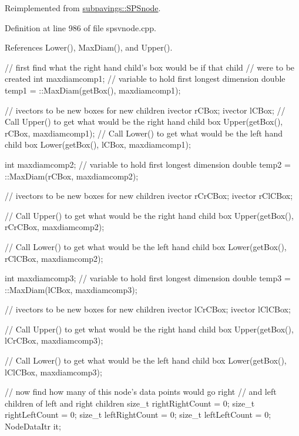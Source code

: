 \-Reimplemented from \hyperlink{classsubpavings_1_1SPSnode_acbe47754c218f0c895a900330491cbb3}{subpavings\-::\-S\-P\-Snode}.



\-Definition at line 986 of file spsvnode.\-cpp.



\-References \-Lower(), \-Max\-Diam(), and \-Upper().


\begin{DoxyCode}
    {
        // first find what the right hand child's box would be if that child
        // were to be created
            int maxdiamcomp1; // variable to hold first longest dimension
            double temp1 = ::MaxDiam(getBox(), maxdiamcomp1);

            // ivectors to be new boxes for new children
            ivector rCBox;
            ivector lCBox;
            // Call Upper() to get what would be the right hand child box
            Upper(getBox(), rCBox, maxdiamcomp1);
            // Call Lower() to get what would be the left hand child box
            Lower(getBox(), lCBox, maxdiamcomp1);

            int maxdiamcomp2; // variable to hold first longest dimension
            double temp2 = ::MaxDiam(rCBox, maxdiamcomp2);

            // ivectors to be new boxes for new children
            ivector rCrCBox;
            ivector rClCBox;

            // Call Upper() to get what would be the right hand child box
            Upper(getBox(), rCrCBox, maxdiamcomp2);

            // Call Lower() to get what would be the left hand child box
            Lower(getBox(), rClCBox, maxdiamcomp2);

            int maxdiamcomp3; // variable to hold first longest dimension
            double temp3 = ::MaxDiam(lCBox, maxdiamcomp3);

            // ivectors to be new boxes for new children
            ivector lCrCBox;
            ivector lClCBox;

            // Call Upper() to get what would be the right hand child box
            Upper(getBox(), lCrCBox, maxdiamcomp3);

            // Call Lower() to get what would be the left hand child box
            Lower(getBox(), lClCBox, maxdiamcomp3);


        // now find how many of this node's data points would go right
        // and left children of left and right children
        size_t rightRightCount = 0;
        size_t rightLeftCount = 0;
        size_t leftRightCount = 0;
        size_t leftLeftCount = 0;
        NodeDataItr it;

}
\end{DoxyCode}
